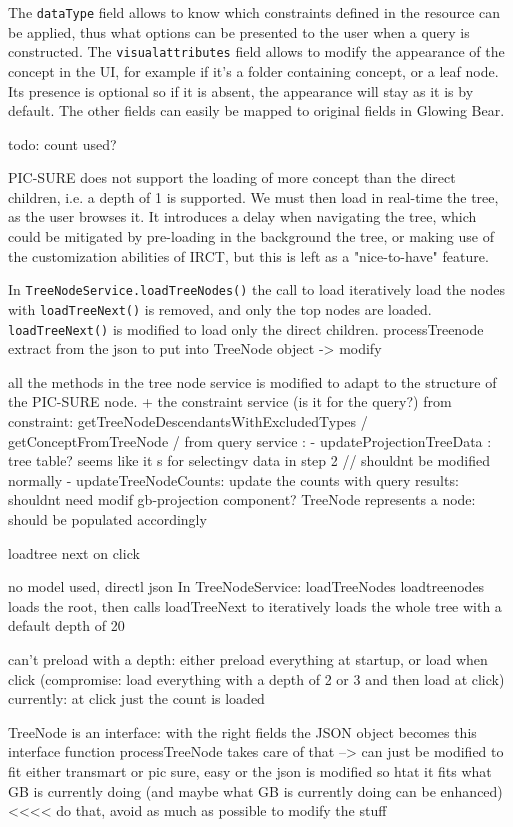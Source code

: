 The \verb|dataType| field allows to know which constraints defined in the resource can be applied, thus what options can be presented to the user when a query is constructed.
The \verb|visualattributes| field allows to modify the appearance of the concept in the UI, for example if it's a folder containing concept, or a leaf node. 
Its presence is optional so if it is absent, the appearance will stay as it is by default.
The other fields can easily be mapped to original fields in Glowing Bear.

todo: count used?

PIC-SURE does not support the loading of more concept than the direct children, i.e. a depth of 1 is supported.
We must then load in real-time the tree, as the user browses it.
It introduces a delay when navigating the tree, which could be mitigated by pre-loading in the background the tree, or making use of the customization abilities of IRCT, but this is left as a "nice-to-have" feature.

In \verb|TreeNodeService.loadTreeNodes()| the call to load iteratively load the nodes with \verb|loadTreeNext()| is removed, and only the top nodes are loaded.
\verb|loadTreeNext()| is modified to load only the direct children.
processTreenode extract from the json to put into TreeNode object -> modify

all the methods in the tree node service is modified to adapt to the structure of the PIC-SURE node. + the constraint service (is it for the query?)
from constraint: getTreeNodeDescendantsWithExcludedTypes / getConceptFromTreeNode / 
from query service : 
- updateProjectionTreeData : tree table? seems like it s for selectingv data in step 2 // shouldnt be modified normally
- updateTreeNodeCounts: update the counts with query results: shouldnt need modif
gb-projection component?
TreeNode represents a node: should be populated accordingly 

loadtree next on click

no model used, directl json
In TreeNodeService:
loadTreeNodes
loadtreenodes loads the root, then calls loadTreeNext to iteratively loads the whole tree with a default depth of 20

can't preload with a depth: either preload everything at startup, or load when click (compromise: load everything with a depth of 2 or 3 and then load at click)
currently: at click just the count is loaded


TreeNode is an interface: with the right fields the JSON object becomes this interface
function processTreeNode takes care of that --> can just be modified to fit either transmart or pic sure, easy
or the json is modified so htat it fits what GB is currently doing (and maybe what GB is currently doing can be enhanced) <<<< do that, avoid as much as possible to modify the stuff 

